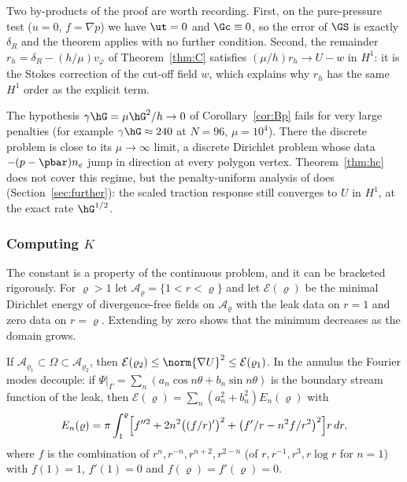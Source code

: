 Two by-products of the proof are worth recording. First, on the pure-pressure test ($u=0$, $f=\nabla p$) we have $\ut=0$ and $\Gc\equiv0$, so the error of $\GS$ is exactly $\delta_R$ and the theorem applies with no further condition. Second, the remainder $r_h=\delta_R-(h/\mu)v_\varphi$ of Theorem~\ref{thm:C} satisfies $(\mu/h)r_h\to U-w$ in $H^1$: it is the Stokes correction of the cut-off field $w$, which explains why $r_h$ has the same $H^1$ order as the explicit term.

\begin{remark}
The hypothesis $\gamma\hG=\mu\hG^2/h\to0$ of Corollary~\ref{cor:Bp} fails for very large penalties (for example $\gamma\hG\approx240$ at $N=96$, $\mu=10^4$). There the discrete problem is close to its $\mu\to\infty$ limit, a discrete Dirichlet problem whose data $-(p-\pbar)n_e$ jump in direction at every polygon vertex. Theorem~\ref{thm:hc} does not cover this regime, but the penalty-uniform analysis of \cite{PadhiExt} does (Section~\ref{sec:further}): the scaled traction response still converges to $U$ in $H^1$, at the exact rate $\hG^{1/2}$.
\end{remark}

\subsubsection*{Computing $K$}
The constant is a property of the continuous problem, and it can be bracketed rigorously. For $\varrho>1$ let $\mathcal A_\varrho=\{1<r<\varrho\}$ and let $\mathcal E(\varrho)$ be the minimal Dirichlet energy of divergence-free fields on $\mathcal A_\varrho$ with the leak data on $r=1$ and zero data on $r=\varrho$. Extending by zero shows that the minimum decreases as the domain grows.

\begin{proposition}\label{prop:bracket}
If $\mathcal A_{\varrho_1}\subset\Omega\subset\mathcal A_{\varrho_2}$, then $\mathcal E(\varrho_2)\le\norm{\nabla U}^2\le\mathcal E(\varrho_1)$. In the annulus the Fourier modes decouple: if $\Psi|_\Gamma=\sum_n(a_n\cos n\theta+b_n\sin n\theta)$ is the boundary stream function of the leak, then $\mathcal E(\varrho)=\sum_n(a_n^2+b_n^2)E_n(\varrho)$ with
\[
E_n(\varrho)=\pi\int_1^\varrho\Bigl[f''^2+2n^2\bigl((f/r)'\bigr)^2+\bigl(f'/r-n^2f/r^2\bigr)^2\Bigr]r\,dr,
\]
where $f$ is the combination of $r^n,r^{-n},r^{n+2},r^{2-n}$ (of $r,r^{-1},r^3,r\log r$ for $n=1$) with $f(1)=1$, $f'(1)=0$ and $f(\varrho)=f'(\varrho)=0$.
\end{proposition}


